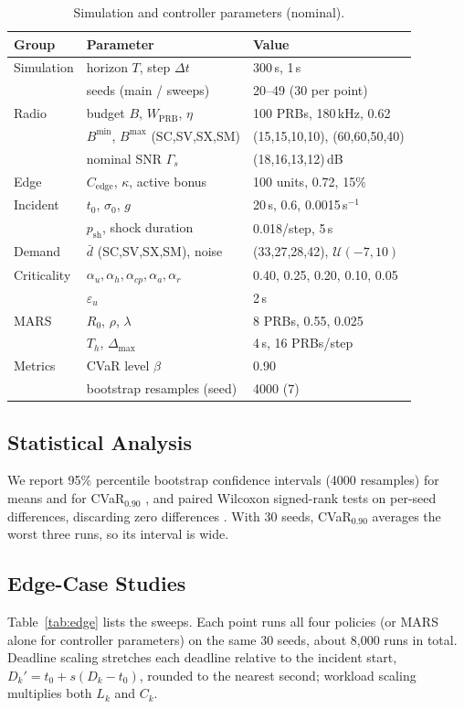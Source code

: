 \documentclass[conference]{IEEEtran}
\begin{document}
\begin{table}[t]
\centering
\caption{Simulation and controller parameters (nominal).}
\label{tab:params}
\scriptsize
\setlength{\tabcolsep}{3pt}
\begin{tabular}{lll}
\toprule
Group & Parameter & Value\\
\midrule
Simulation & horizon $T$, step $\Delta t$ & 300\,s, 1\,s\\
 & seeds (main / sweeps) & 20--49 (30 per point)\\
Radio & budget $B$, $W_{\mathrm{PRB}}$, $\eta$ & 100 PRBs, 180\,kHz, 0.62\\
 & $B^{\min}$, $B^{\max}$ (SC,SV,SX,SM) & (15,15,10,10), (60,60,50,40)\\
 & nominal SNR $\Gamma_s$ & (18,16,13,12)\,dB\\
Edge & $C_{\mathrm{edge}}$, $\kappa$, active bonus & 100 units, 0.72, 15\%\\
Incident & $t_0$, $\sigma_0$, $g$ & 20\,s, 0.6, 0.0015\,s$^{-1}$\\
 & $p_{\mathrm{sh}}$, shock duration & 0.018/step, 5\,s\\
Demand & $\bar d$ (SC,SV,SX,SM), noise & (33,27,28,42), $\mathcal{U}(-7,10)$\\
Criticality & $\alpha_u,\alpha_h,\alpha_{cp},\alpha_a,\alpha_r$ & 0.40, 0.25, 0.20, 0.10, 0.05\\
 & $\varepsilon_u$ & 2\,s\\
MARS & $R_0$, $\rho$, $\lambda$ & 8 PRBs, 0.55, 0.025\\
 & $T_h$, $\Delta_{\max}$ & 4\,s, 16 PRBs/step\\
Metrics & CVaR level $\beta$ & 0.90\\
 & bootstrap resamples (seed) & 4000 (7)\\
\bottomrule
\end{tabular}
\end{table}

\subsection{Statistical Analysis}
We report 95\% percentile bootstrap confidence intervals (4000 resamples) for means and for CVaR$_{0.90}$ \cite{bootstrap}, and paired Wilcoxon signed-rank tests on per-seed differences, discarding zero differences \cite{wilcoxon}. With 30 seeds, CVaR$_{0.90}$ averages the worst three runs, so its interval is wide.

\subsection{Edge-Case Studies}
Table~\ref{tab:edge} lists the sweeps. Each point runs all four policies (or MARS alone for controller parameters) on the same 30 seeds, about 8{,}000 runs in total. Deadline scaling stretches each deadline relative to the incident start, $D_k'=t_0+s(D_k-t_0)$, rounded to the nearest second; workload scaling multiplies both $L_k$ and $C_k$.
\end{document}
